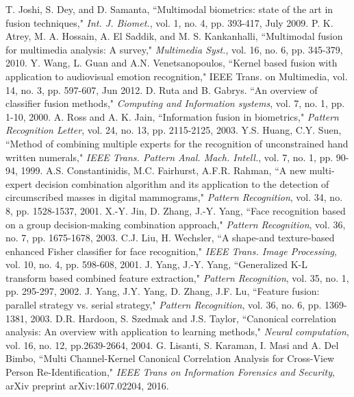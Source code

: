 \documentclass[journal]{IEEEtran}
\begin{document}
\begin{thebibliography}{1}
T. Joshi, S. Dey, and D. Samanta, ``Multimodal biometrics: state of the art in fusion techniques," \emph{Int. J. Biomet.}, vol. 1, no. 4, pp. 393-417, July 2009.
P. K. Atrey, M. A. Hossain, A. El Saddik, and M. S. Kankanhalli, ``Multimodal fusion for multimedia analysis: A survey," \emph{Multimedia Syst.}, vol. 16, no. 6, pp. 345-379, 2010.
Y. Wang, L. Guan and A.N. Venetsanopoulos, ``Kernel based fusion with application to audiovisual emotion recognition," IEEE Trans. on Multimedia, vol. 14, no. 3, pp. 597-607, Jun 2012.
D. Ruta and B. Gabrys. ``An overview of classifier fusion methods," \emph{Computing and Information systems}, vol. 7, no. 1, pp. 1-10, 2000.
A. Ross and A. K. Jain, ``Information fusion in biometrics," \emph{Pattern Recognition Letter}, vol. 24, no. 13, pp. 2115-2125, 2003.
Y.S. Huang, C.Y. Suen, ``Method of combining multiple experts for the recognition of unconstrained hand written numerals," \emph{IEEE Trans. Pattern Anal. Mach. Intell.}, vol. 7, no. 1, pp. 90-94, 1999.
A.S. Constantinidis, M.C. Fairhurst, A.F.R. Rahman, ``A new multi-expert decision combination algorithm and its application to the detection of circumscribed masses in digital mammograms," \emph{Pattern Recognition}, vol. 34, no. 8, pp. 1528-1537, 2001.
X.-Y. Jin, D. Zhang, J.-Y. Yang, ``Face recognition based on a group decision-making combination approach," \emph{Pattern Recognition}, vol. 36, no. 7, pp. 1675-1678, 2003.
C.J. Liu, H. Wechsler, ``A shape-and texture-based enhanced Fisher classifier for face recognition," \emph{IEEE Trans. Image Processing}, vol. 10, no. 4, pp. 598-608, 2001.
J. Yang, J.-Y. Yang, ``Generalized K-L transform based combined feature extraction," \emph{Pattern Recognition}, vol. 35, no. 1, pp. 295-297, 2002.
J. Yang, J.Y. Yang, D. Zhang, J.F. Lu, ``Feature fusion: parallel strategy vs. serial strategy," \emph{Pattern Recognition}, vol. 36, no. 6, pp. 1369-1381, 2003.
D.R. Hardoon, S. Szedmak and J.S. Taylor, ``Canonical correlation analysis: An overview with application to learning methods," \emph{Neural computation}, vol. 16, no. 12, pp.2639-2664, 2004.
G. Lisanti, S. Karaman, I. Masi and A. Del Bimbo, ``Multi Channel-Kernel Canonical Correlation Analysis for Cross-View Person Re-Identification," \emph{IEEE Trans on Information Forensics and Security}, arXiv preprint arXiv:1607.02204, 2016.

\end{thebibliography}
\end{document}

